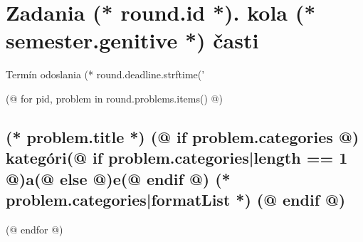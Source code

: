 \documentclass[12pt, twoside]{article}
\newcounter{volume}
\newcounter{semester}
\newcounter{round}
\newcounter{problem}
\begin{document}
    \pagestyle{problems-(* competition.id *)-(* volume.id *)-(* semester.id *)-(* round.id *)}
    \thispagestyle{first}
    \vspace*{8mm}

    {
        \section{\texorpdfstring{Zadania (* round.id *). kola (* semester.genitive *) časti}{Zadania}}
        \centering
        \vspace*{-5mm}
        Termín odoslania (* round.deadline.strftime('%
    } 
        
    (@ for pid, problem in round.problems.items() @)%
        \setcounter{volume}{(* volume.number *)}%
        \setcounter{semester}{(* semester.number *)}%
        \setcounter{round}{(* round.number *)}%
        \setcounter{problem}{(* problem.number *)}%
        
        \subsection{%
            \texorpdfstring{%
                \large \textbf{(* problem.title *)}%
                (@ if problem.categories @)%
                \normalsize \hfill kategóri(@ if problem.categories|length == 1 @)a(@ else @)e(@ endif @) (* problem.categories|formatList *)%
                (@ endif @)
            }{%
                (* round.number *).(* problem.number *) (* problem.title *)%
            }%
        }%
    (@ endfor @)
\end{document}
